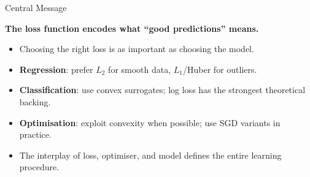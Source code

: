 \begin{frame}{Central Message}
  \begin{center}
    \Large
    \textbf{The loss function encodes what ``good predictions'' means.}
  \end{center}

  \vspace{.5em}
  \begin{itemize}
    \item Choosing the right loss is as important as choosing the model.
    \item \textbf{Regression}: prefer $L_2$ for smooth data, $L_1$/Huber for outliers.
    \item \textbf{Classification}: use convex surrogates; log loss has the strongest theoretical backing.
    \item \textbf{Optimisation}: exploit convexity when possible; use SGD variants in practice.
    \item The interplay of loss, optimiser, and model defines the entire learning procedure.
  \end{itemize}

\end{frame}

%
